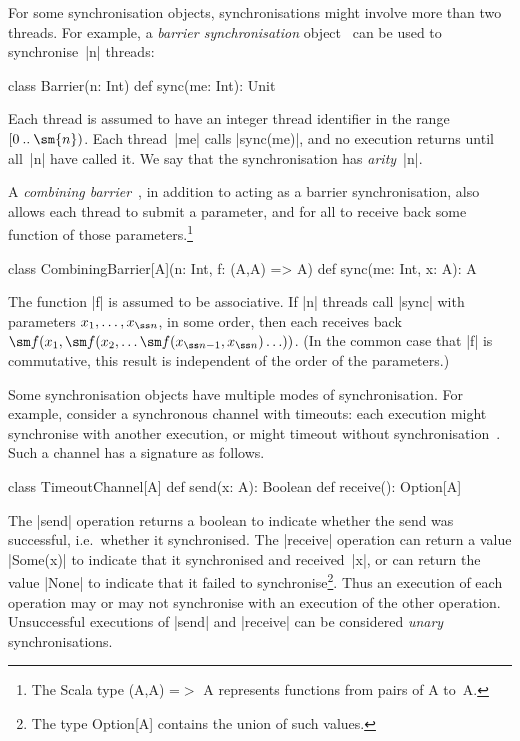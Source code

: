 For some synchronisation objects, synchronisations might involve more than two
threads.  For example, a \emph{barrier synchronisation}
object~\cite{andrews,JCSP,SCL} can be used to synchronise~|n| threads:
%
\begin{scala}
class Barrier(n: Int){
  def sync(me: Int): Unit
}
\end{scala}
%
Each thread is assumed to have an integer thread identifier in the range
$\range{0}{\sm{n}}$.  Each thread~|me| calls |sync(me)|, and no execution
returns until all~|n| have called it.  We say that the synchronisation has
\emph{arity}~|n|.

A \emph{combining barrier}~\cite{andrews,SCL}, in addition to acting as a barrier
synchronisation, also allows each thread to submit a parameter, and for all to
receive back some function of those parameters.\footnote{The Scala type
  {\scalashape (A,A) =}$>$ {\scalashape A} represents functions from pairs of
  {\scalashape A} to~{\scalashape A}.}
%
\pagebreak[3]
\begin{scala}
class CombiningBarrier[A](n: Int, f: (A,A) => A){
  def sync(me: Int, x: A): A
}
\end{scala}
%
The function |f| is assumed to be associative.  If |n| threads call |sync|
with parameters $x_1, \ldots, x_{\ss n}$, in some order, then each receives
back $\sm f(x_1, \sm f(x_2, \ldots \sm f(x_{{\ss n}-1}, x_{\ss n}) \ldots ))$.
(In the common case that |f| is commutative, this result is independent of the
order of the parameters.)

Some synchronisation objects have multiple modes of synchronisation.  For
example, consider a synchronous channel with timeouts: each execution might
synchronise with another execution, or might timeout without
synchronisation~\cite{sufrin:CSO,SCL}.  Such a channel has a signature as
follows.
%
\begin{scala}
class TimeoutChannel[A]{
  def send(x: A): Boolean
  def receive(): Option[A]
}
\end{scala}
%
The |send| operation returns a boolean to indicate whether the send was
successful, i.e.~whether it synchronised.  The |receive| operation can return
a value |Some(x)| to indicate that it synchronised and received~|x|, or can
return the value |None| to indicate that it failed to synchronise\footnote{The
  type {\scalashape Option[A]} contains the union of such values.}.  Thus an
execution of each operation may or may not synchronise with an execution of
the other operation.  Unsuccessful executions of |send| and |receive|
can be considered \emph{unary} synchronisations.  

